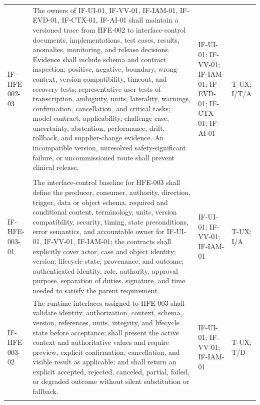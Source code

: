 \documentclass[11pt,letterpaper]{article}
\begin{document}
\begin{scriptsize}
\begin{longtable}{@{}L{0.14\textwidth}L{0.49\textwidth}L{0.19\textwidth}L{0.10\textwidth}@{}}
\addlinespace[2pt]
\mbox{IF-HFE-002-03} & The owners of IF-UI-01, IF-VV-01, IF-IAM-01, IF-EVD-01, IF-CTX-01, IF-AI-01 shall maintain a versioned trace from HFE-002 to interface-control documents, implementations, test cases, results, anomalies, monitoring, and release decisions. Evidence shall include schema and contract inspection; positive, negative, boundary, wrong-context, version-compatibility, timeout, and recovery tests; representative-user tests of transcription, ambiguity, units, laterality, warnings, confirmation, cancellation, and critical tasks; model-contract, applicability, challenge-case, uncertainty, abstention, performance, drift, rollback, and supplier-change evidence. An incompatible version, unresolved safety-significant failure, or uncommissioned route shall prevent clinical release. & IF-UI-01; IF-VV-01; IF-IAM-01; IF-EVD-01; IF-CTX-01; IF-AI-01 & T-UX; I\slash\allowbreak{}T\slash\allowbreak{}A \\
\addlinespace[2pt]
 \\
\addlinespace[2pt]
\mbox{IF-HFE-003-01} & The interface-control baseline for HFE-003 shall define the producer, consumer, authority, direction, trigger, data or object schema, required and conditional content, terminology, units, version compatibility, security, timing, state preconditions, error semantics, and accountable owner for IF-UI-01, IF-VV-01, IF-IAM-01; the contracts shall explicitly cover actor, case and object identity; version; lifecycle state; provenance; and outcome; authenticated identity, role, authority, approval purpose, separation of duties, signature, and time needed to satisfy the parent requirement. & IF-UI-01; IF-VV-01; IF-IAM-01 & T-UX; I\slash\allowbreak{}A \\
\addlinespace[2pt]
\mbox{IF-HFE-003-02} & The runtime interfaces assigned to HFE-003 shall validate identity, authorization, context, schema, version, references, units, integrity, and lifecycle state before acceptance; shall present the active context and authoritative values and require preview, explicit confirmation, cancellation, and visible result as applicable; and shall return an explicit accepted, rejected, canceled, partial, failed, or degraded outcome without silent substitution or fallback. & IF-UI-01; IF-VV-01; IF-IAM-01 & T-UX; T\slash\allowbreak{}D \\
\addlinespace[2pt]

\end{longtable}
\end{scriptsize}
\end{document}

